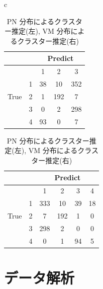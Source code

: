 \documentclass[a4j,12pt]{jarticle}
\begin{document}
\begin{table}[tbp]
\caption{PN 分布によるクラスター推定(左), VM 分布によるクラスター推定(右)}
\begin{tabular}{c}
\hspace{1.5cm}
\begin{minipage}{0.5\hsize}
\begin{center}
\begin{tabular}{|c|c|c|c|c|}
\hline
 &  & \multicolumn{3}{|c|}{Predict} \\ \hline
 &  & 1 & 2 & 3 \\ \hline 
 &1 & 38 & 10 & 352 \\ \cline{2-5}
True
 & 2 & 1 & 192 & 7 \\ \cline{2-5}
 & 3 & 0 & 2  & 298 \\ \cline{2-5}
 & 4 & 93 & 0 & 7 \\ 
\hline
 \end{tabular}
 \end{center}
\end{minipage}

\hspace{-2.5cm}
\begin{minipage}{0.5\hsize}
\begin{center}
\begin{tabular}{|c|c|c|c|c|c|}
\hline
 &  & \multicolumn{4}{|c|}{Predict} \\ \hline
 &  & 1 & 2 & 3 & 4 \\ \hline 
 & 1 & 333 & 10 & 39 & 18 \\ \cline{2-6}
True
 & 2 & 7 & 192 & 1 & 0 \\ \cline{2-6}
 & 3 & 298 & 2  & 0 & 0 \\ \cline{2-6}
 & 4 & 0 & 1 & 94 & 5 \\ 
\hline
\end{tabular}
\end{center}
\end{minipage}

\end{tabular}
\end{table}
\fi

\section{データ解析}
\end{document}
